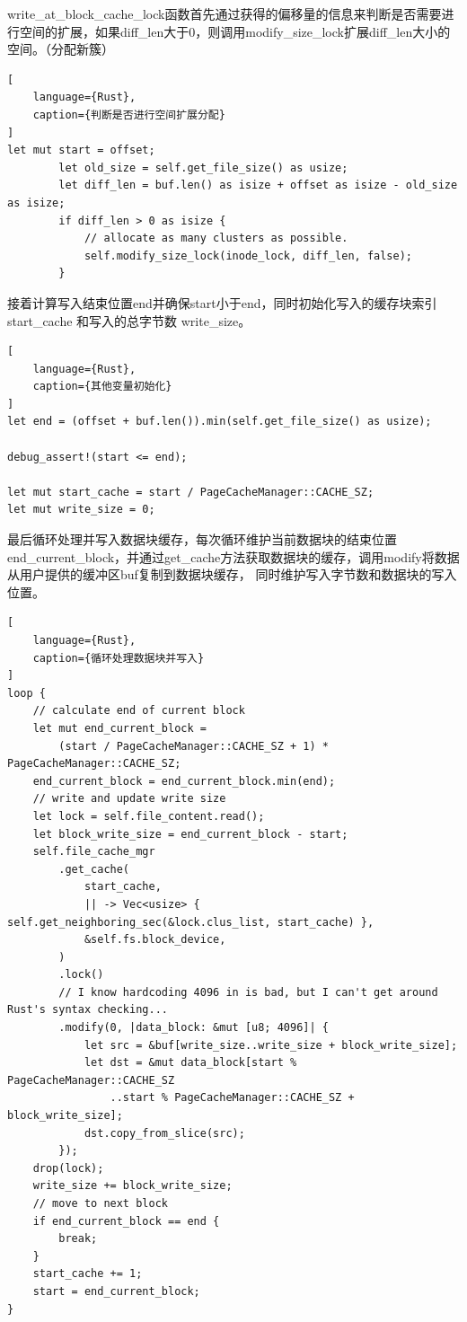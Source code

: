write_at_block_cache_lock函数首先通过获得的偏移量的信息来判断是否需要进行空间的扩展，如果diff_len大于0，则调用modify_size_lock扩展diff_len大小的空间。（分配新簇）
\begin{lstlisting}[
    language={Rust},
    caption={判断是否进行空间扩展分配}
]
let mut start = offset;
        let old_size = self.get_file_size() as usize;
        let diff_len = buf.len() as isize + offset as isize - old_size as isize;
        if diff_len > 0 as isize {
            // allocate as many clusters as possible.
            self.modify_size_lock(inode_lock, diff_len, false);
        }
\end{lstlisting}

接着计算写入结束位置end并确保start小于end，同时初始化写入的缓存块索引 start_cache 和写入的总字节数 write_size。

\begin{lstlisting}[
    language={Rust},
    caption={其他变量初始化}
]
let end = (offset + buf.len()).min(self.get_file_size() as usize);

debug_assert!(start <= end);

let mut start_cache = start / PageCacheManager::CACHE_SZ;
let mut write_size = 0;
\end{lstlisting}

最后循环处理并写入数据块缓存，每次循环维护当前数据块的结束位置end_current_block，并通过get_cache方法获取数据块的缓存，调用modify将数据从用户提供的缓冲区buf复制到数据块缓存，
同时维护写入字节数和数据块的写入位置。

\begin{lstlisting}[
    language={Rust},
    caption={循环处理数据块并写入}
]
loop {
    // calculate end of current block
    let mut end_current_block =
        (start / PageCacheManager::CACHE_SZ + 1) * PageCacheManager::CACHE_SZ;
    end_current_block = end_current_block.min(end);
    // write and update write size
    let lock = self.file_content.read();
    let block_write_size = end_current_block - start;
    self.file_cache_mgr
        .get_cache(
            start_cache,
            || -> Vec<usize> { self.get_neighboring_sec(&lock.clus_list, start_cache) },
            &self.fs.block_device,
        )
        .lock()
        // I know hardcoding 4096 in is bad, but I can't get around Rust's syntax checking...
        .modify(0, |data_block: &mut [u8; 4096]| {
            let src = &buf[write_size..write_size + block_write_size];
            let dst = &mut data_block[start % PageCacheManager::CACHE_SZ
                ..start % PageCacheManager::CACHE_SZ + block_write_size];
            dst.copy_from_slice(src);
        });
    drop(lock);
    write_size += block_write_size;
    // move to next block
    if end_current_block == end {
        break;
    }
    start_cache += 1;
    start = end_current_block;
}
\end{lstlisting}
